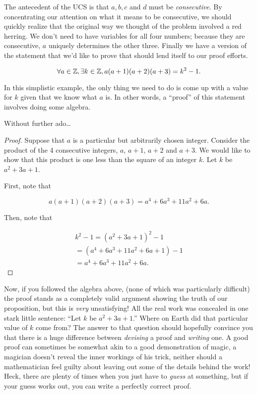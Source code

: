 The antecedent of the UCS is that $a,b,c$ and $d$ must be 
{\em consecutive}.  By concentrating our attention on what it 
means to be consecutive, we should quickly realize that the original
way we thought of the problem involved a red herring.  We don't need 
to have variables for all four numbers; because they are consecutive, 
$a$ uniquely determines the other three.  Finally we have a version 
of the statement that we'd like to prove that should lend itself
to our proof efforts.

\begin{thm} 
\[ \forall a \in {\mathbb Z}, \exists k \in {\mathbb Z}, 
a(a+1)(a+2)(a+3) = k^2 - 1. \]
\end{thm}

In this simplistic example, the only thing we need to do is come 
up with a value for $k$ given that we know what $a$ is.  In other 
words, a ``proof'' of this statement involves doing some algebra.

Without further ado\ldots

\begin{proof}
Suppose that $a$ is a particular but arbitrarily chosen 
integer.  Consider the product of the 4 consecutive integers, $a$, 
$a+1$, $a+2$ and $a+3$.  We would like to show that this product is 
one less than the square of an integer $k$.  Let $k$ be $a^2+3a+1$.  

First, note that 

\[  a(a+1)(a+2)(a+3) = a^4 + 6a^3 + 11a^2 + 6a. \]

Then, note that

\begin{gather*} 
k^2 - 1 = (a^2 + 3a +1)^2 - 1 \\
= (a^4  + 6a^3 + 11a^2 + 6a + 1) - 1 \\
= a^4 + 6a^3 + 11a^2 + 6a. 
\end{gather*}

\end{proof} 

Now, if you followed the algebra above, (none of which was particularly 
difficult) the proof stands as a completely valid argument showing the 
truth of our proposition, but this is \emph{very} unsatisfying!  All 
the real work was concealed in one stark little sentence:
``Let $k$ be $a^2+3a+1$.''   Where on Earth did that particular value 
of $k$ come from?  The answer to that question should hopefully 
convince you that there is a huge difference between \emph{devising} 
a proof and \emph{writing} one.  A good proof can sometimes be
somewhat akin to a good demonstration of magic, a magician doesn't 
reveal the inner workings of his trick, neither should a mathematician 
feel guilty about leaving out some of the details behind the work!  
Heck, there are plenty of times when you just have to \emph{guess} 
at something, but if your guess works out, you can write
a perfectly correct proof.  

